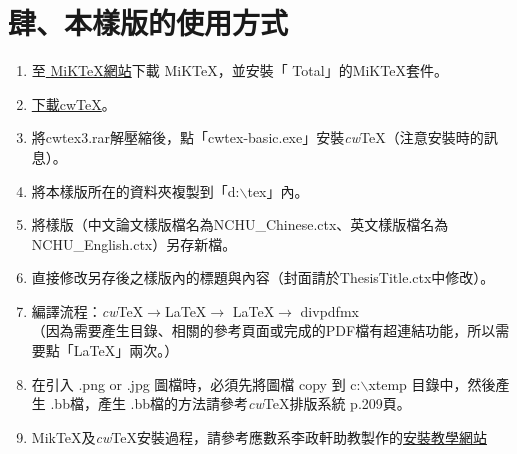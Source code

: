 \chapter{肆、本樣版的使用方式}
\begin{enumerate}
    \item 至\href{http://www.miktex.org/}{ MiKTeX網站}下載 MiK\TeX ，並安裝「 Total」的MiK\TeX 套件。
    \item \href{http://www.amath.nchu.edu.tw/~u4815977/cwtex3.rar}{下載cw\TeX}。
    \item 將cwtex3.rar解壓縮後，點「cwtex-basic.exe」安裝\textit{cw}\TeX （注意安裝時的訊息）。
    \item 將本樣版所在的資料夾複製到「d:$\backslash$tex」內。
    \item 將樣版（中文論文樣版檔名為NCHU\_Chinese.ctx、英文樣版檔名為NCHU\_English.ctx）另存新檔。
    \item 直接修改另存後之樣版內的標題與內容（封面請於ThesisTitle.ctx中修改）。
    \item 編譯流程：\textit{cw}\TeX $\rightarrow$\LaTeX $\rightarrow$ \LaTeX $\rightarrow$ divpdfmx\\
        （因為需要產生目錄、相關的參考頁面或完成的PDF檔有超連結功能，所以需要點「\LaTeX 」兩次。）
    \item 在引入 .png or .jpg 圖檔時，必須先將圖檔 copy 到 c:$\backslash$xtemp 目錄中，然後產生 .bb檔，產生 .bb檔的方法請參考\textit{cw}\TeX 排版系統 p.209頁。
    \item Mik\TeX 及\textit{cw}\TeX 安裝過程，請參考應數系李政軒助教製作的\href{http://www.amath.nchu.edu.tw/~u4815977/How_to_Install_cwTeX/How_to_Install_cwTeX.html}{安裝教學網站}
\end{enumerate}
% 